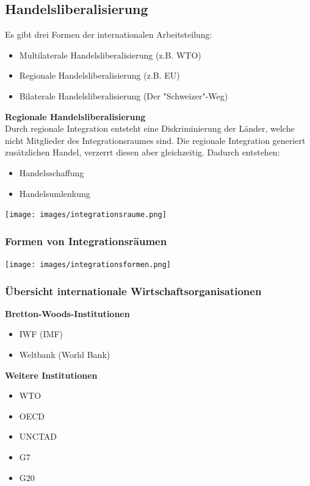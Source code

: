 \subsection{Handelsliberalisierung}
\begin{minipage}{0.35\linewidth}
	Es gibt drei Formen der internationalen Arbeitsteilung:
	\begin{itemize}
		\item Multilaterale Handelsliberalisierung (z.B. WTO)
		\item Regionale Handelsliberalisierung (z.B. EU)
		\item Bilaterale Handelsliberalisierung (Der "Schweizer"-Weg)
	\end{itemize}
	\vspace{\baselineskip}
	\textbf{Regionale Handelsliberalisierung}\\
	Durch regionale Integration entsteht eine Diskriminierung der Länder, welche nicht Mitglieder des Integrationsraumes sind. Die regionale Integration generiert zusätzlichen Handel, verzerrt diesen aber gleichzeitig. Dadurch entstehen: 
	\begin{itemize}
		\item Handelsschaffung
		\item Handelsumlenkung
	\end{itemize}
\end{minipage}
\begin{minipage}{0.6\linewidth}
	\texttt{[image: images/integrationsraume.png]}
\end{minipage}

\begin{minipage}{0.6\linewidth}
	\subsubsection{Formen von Integrationsräumen}
	\texttt{[image: images/integrationsformen.png]}
\end{minipage}
\begin{minipage}{0.3\linewidth}
	\subsubsection{Übersicht internationale Wirtschaftsorganisationen}
	\textbf{Bretton-Woods-Institutionen}
	\begin{itemize}
		\item IWF (IMF)
		\item Weltbank (World Bank)
	\end{itemize}
	\textbf{Weitere Institutionen}
	\begin{itemize}
		\item WTO
		\item OECD
		\item UNCTAD
		\item G7
		\item G20
	\end{itemize}
\end{minipage}

